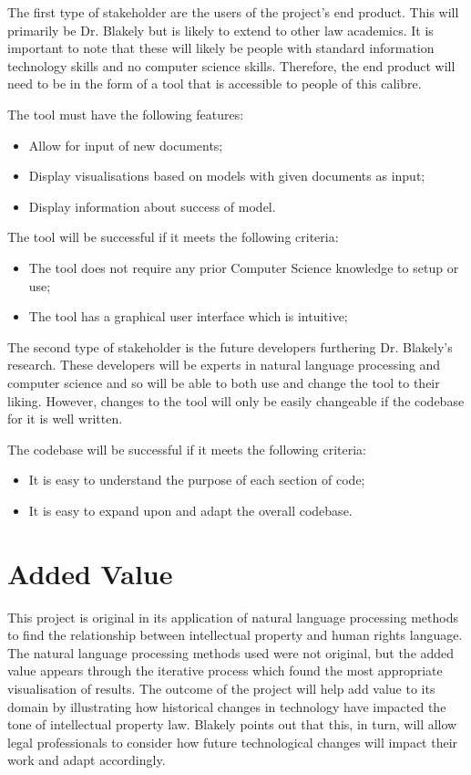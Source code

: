 			The first type of stakeholder are the users of the project’s end product. This will primarily be Dr. Blakely but is likely to extend to other law academics. It is important to note that these will likely be people with standard information technology skills and no computer science skills. Therefore, the end product will need to be in the form of a tool that is accessible to people of this calibre.  

			The tool must have the following features: 
			\begin{itemize}
				\item Allow for input of new documents;
				\item Display visualisations based on models with given documents as input;
				\item Display information about success of model.
			\end{itemize}

			The tool will be successful if it meets the following criteria: 
			\begin{itemize}
				\item The tool does not require any prior Computer Science knowledge to setup or use;
				\item The tool has a graphical user interface which is intuitive; 
			\end{itemize}
			
			The second type of stakeholder is the future developers furthering Dr. Blakely's research. These developers will be experts in natural language processing and computer science and so will be able to both use and change the tool to their liking. However, changes to the tool will only be easily changeable if the codebase for it is well written. 

			The codebase will be successful if it meets the following criteria:
			\begin{itemize}
				\item It is easy to understand the purpose of each section of code;
				\item It is easy to expand upon and adapt the overall codebase.
			\end{itemize}

		\section{Added Value}
			This project is original in its application of natural language processing methods to find the relationship between intellectual property and human rights language. The natural language processing methods used were not original, but the added value appears through the iterative process which found the most appropriate visualisation of results. The outcome of the project will help add value to its domain by illustrating how historical changes in technology have impacted the tone of intellectual property law. Blakely points out that this, in turn, will allow legal professionals to consider how future technological changes will impact their work and adapt accordingly.